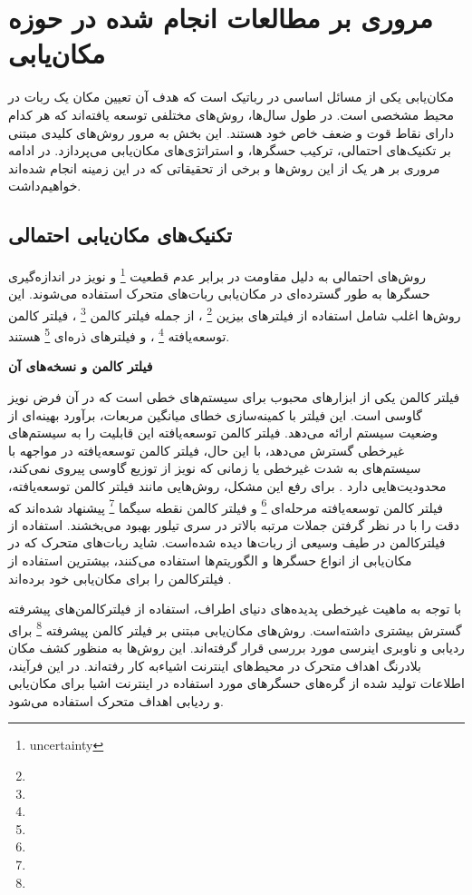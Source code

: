 \section{مروری بر مطالعات انجام شده در حوزه مکان‌یابی} 

مکان‌یابی یکی از مسائل اساسی در رباتیک است که هدف آن تعیین مکان یک ربات در محیط مشخصی است. در طول سال‌ها، روش‌های مختلفی توسعه یافته‌اند که هر کدام دارای نقاط قوت و ضعف خاص خود هستند. این بخش به مرور روش‌های کلیدی مبتنی بر تکنیک‌های احتمالی، ترکیب حسگرها، و استراتژی‌های مکان‌یابی می‌پردازد. در ادامه مروری بر هر یک از این روش‌ها و برخی از تحقیقاتی که در این زمینه انجام شده‌اند خواهیم‌داشت.


\subsection{تکنیک‌های مکان‌یابی احتمالی}

روش‌های احتمالی به دلیل مقاومت در برابر عدم قطعیت
\footnote{uncertainty}
 و نویز در اندازه‌گیری حسگرها به طور گسترده‌ای در مکان‌یابی ربات‌های متحرک استفاده می‌شوند. این روش‌ها اغلب شامل استفاده از فیلترهای بیزین
\footnote{}
 ، از جمله فیلتر کالمن
\footnote{}
، فیلتر کالمن توسعه‌یافته
\footnote{}
، و فیلترهای ذره‌ای
\footnote{}
 هستند.


\textbf {فیلتر کالمن و نسخه‌های آن}

فیلتر کالمن یکی از ابزارهای محبوب برای سیستم‌های خطی است که در آن فرض نویز گاوسی است. این فیلتر با کمینه‌سازی خطای میانگین مربعات، برآورد بهینه‌ای از وضعیت سیستم ارائه می‌دهد. فیلتر کالمن توسعه‌یافته این قابلیت را به سیستم‌های غیرخطی گسترش می‌دهد، با این حال،  فیلتر کالمن توسعه‌یافته در مواجهه با سیستم‌های به شدت غیرخطی یا زمانی که نویز از توزیع گاوسی پیروی نمی‌کند، محدودیت‌هایی دارد
\cite{burgard1997active}
. برای رفع این مشکل، روش‌هایی مانند فیلتر کالمن توسعه‌یافته، فیلتر کالمن توسعه‌یافته مرحله‌ای
\footnote{}
 و فیلتر کالمن نقطه سیگما
 \footnote{}
  پیشنهاد شده‌اند که دقت را با در نظر گرفتن جملات مرتبه بالاتر در سری تیلور بهبود می‌بخشند.
استفاده از فیلترکالمن در طیف وسیعی از ربات‌ها دیده‌ شده‌است. شاید ربات‌های متحرک که در مکان‌یابی از انواع حسگر‌ها و الگوریتم‌ها استفاده می‌کنند، بیشترین‌ استفاد‌ه از فیلترکالمن را برای مکان‌یابی خود برده‌اند
\cite{liu2021cost, lin2018topological, negenborn2003robot}. 

با توجه به ماهیت غیرخطی پدیده‌های دنیای اطراف، استفاده از فیلترکالمن‌های پیشرفته گسترش بیشتری داشته‌است. 
\cite{zhan2007iterated, guo2014square, xian2016square, filtermobile} 
 روش‌های مکان‌یابی مبتنی بر فیلتر کالمن پیشرفته
\footnote{}
  برای ردیابی و ناوبری اینرسی مورد بررسی قرار گرفته‌اند. این روش‌ها به منظور کشف مکان بلادرنگ اهداف متحرک در محیط‌های اینترنت اشیاءبه کار رفته‌اند. در این فرآیند، اطلاعات تولید شده از گره‌های حسگرهای مورد استفاده در اینترنت اشیا برای مکان‌یابی و ردیابی اهداف متحرک استفاده می‌شود.
  
